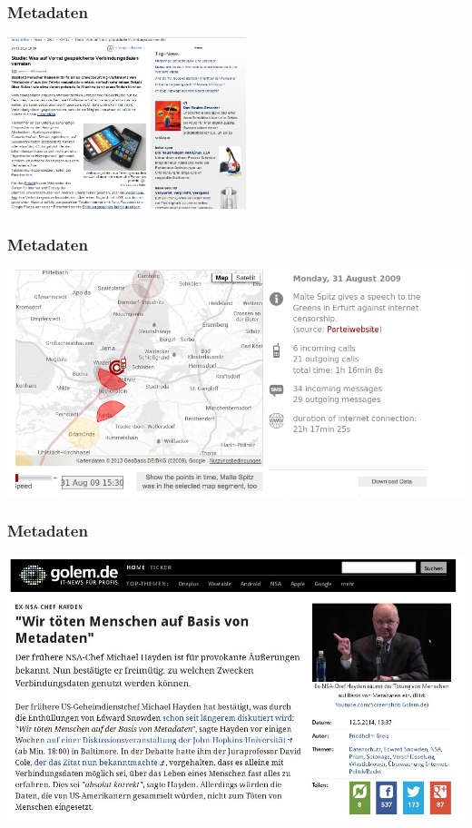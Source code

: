 \documentclass[12pt]{beamer}
\begin{document}
\begin{frame}
  \frametitle{Metadaten}
    \begin{center}
      \includegraphics[height=5cm]{img/metadaten_studie.png}
    \end{center}
\end{frame}

\begin{frame}
    \frametitle{Metadaten}
    \includegraphics[height=0.7\textheight]{img/maltespitz.png}
\end{frame}

\begin{frame}
    \frametitle{Metadaten}
    \includegraphics[height=0.7\textheight]{img/wekillpeople.jpg}
\end{frame}
\end{document}
